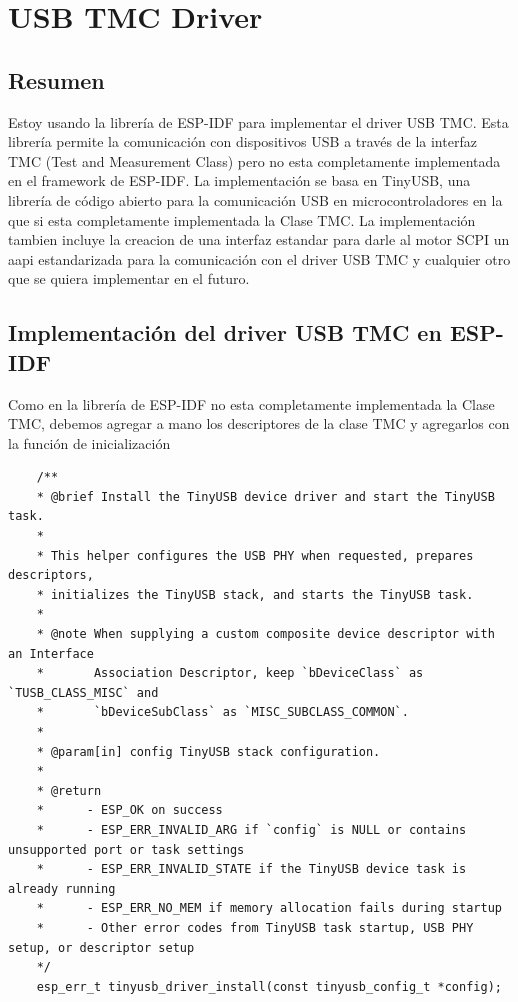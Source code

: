 \chapter[USB TMC Driver]{USB TMC Driver}
\label{cp:USBTMC-Driver}

\section*{Resumen}
Estoy usando la librería de ESP-IDF para implementar el driver USB TMC. Esta librería permite la comunicación con dispositivos USB a través de la interfaz TMC (Test and Measurement Class) pero no esta completamente implementada en el framework de ESP-IDF. La implementación se basa en TinyUSB, una librería de código abierto para la comunicación USB en microcontroladores en la que si esta completamente implementada la Clase TMC. La implementación tambien incluye la creacion de una interfaz estandar para darle al motor SCPI un aapi estandarizada para la comunicación con el driver USB TMC y cualquier otro que se quiera implementar en el futuro.

\section{Implementación del driver USB TMC en ESP-IDF}
Como en la librería de ESP-IDF no esta completamente implementada la Clase TMC, debemos agregar a mano los descriptores de la clase TMC y agregarlos con la función de inicialización
\begin{verbatim}
    /**
    * @brief Install the TinyUSB device driver and start the TinyUSB task.
    *
    * This helper configures the USB PHY when requested, prepares descriptors,
    * initializes the TinyUSB stack, and starts the TinyUSB task.
    *
    * @note When supplying a custom composite device descriptor with an Interface
    *       Association Descriptor, keep `bDeviceClass` as `TUSB_CLASS_MISC` and
    *       `bDeviceSubClass` as `MISC_SUBCLASS_COMMON`.
    *
    * @param[in] config TinyUSB stack configuration.
    *
    * @return
    *      - ESP_OK on success
    *      - ESP_ERR_INVALID_ARG if `config` is NULL or contains unsupported port or task settings
    *      - ESP_ERR_INVALID_STATE if the TinyUSB device task is already running
    *      - ESP_ERR_NO_MEM if memory allocation fails during startup
    *      - Other error codes from TinyUSB task startup, USB PHY setup, or descriptor setup
    */
    esp_err_t tinyusb_driver_install(const tinyusb_config_t *config);
\end{verbatim}

